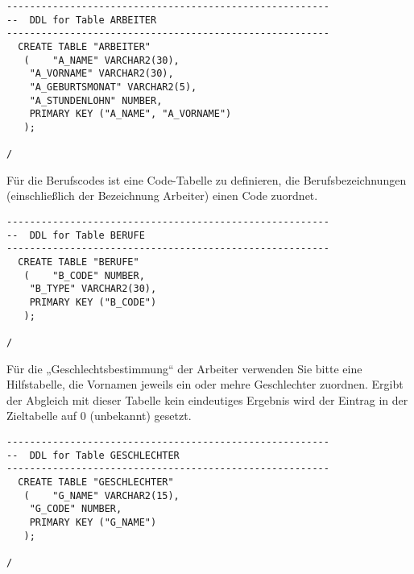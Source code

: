 \documentclass{scrartcl}
\begin{document}
\begin{lstlisting}
--------------------------------------------------------
--  DDL for Table ARBEITER
--------------------------------------------------------
  CREATE TABLE "ARBEITER" 
   (	"A_NAME" VARCHAR2(30), 
	"A_VORNAME" VARCHAR2(30), 
	"A_GEBURTSMONAT" VARCHAR2(5), 
	"A_STUNDENLOHN" NUMBER,
	PRIMARY KEY ("A_NAME", "A_VORNAME")
   );

/
\end{lstlisting}
Für die Berufscodes ist eine Code-Tabelle zu definieren, die Berufsbezeichnungen
(einschließlich der Bezeichnung Arbeiter) einen Code zuordnet.
\begin{lstlisting}
--------------------------------------------------------
--  DDL for Table BERUFE
--------------------------------------------------------
  CREATE TABLE "BERUFE" 
   (	"B_CODE" NUMBER, 
	"B_TYPE" VARCHAR2(30),
	PRIMARY KEY ("B_CODE")
   );

/
\end{lstlisting}
Für die „Geschlechtsbestimmung“ der Arbeiter verwenden Sie bitte eine Hilfstabelle, die
Vornamen jeweils ein oder mehre Geschlechter zuordnen. Ergibt der Abgleich mit
dieser Tabelle kein eindeutiges Ergebnis wird der Eintrag in der Zieltabelle auf 0
(unbekannt) gesetzt. 
\begin{lstlisting}
--------------------------------------------------------
--  DDL for Table GESCHLECHTER
--------------------------------------------------------
  CREATE TABLE "GESCHLECHTER" 
   (	"G_NAME" VARCHAR2(15), 
	"G_CODE" NUMBER,
	PRIMARY KEY ("G_NAME")
   );

/
\end{lstlisting}
\end{document}

